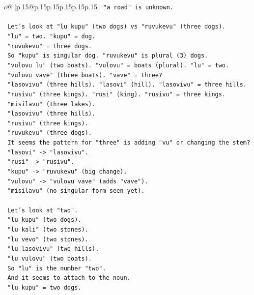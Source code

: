 \documentclass{article}
\begin{document}
{\begin{supertabular}{c@{$\;$}|p{.15\linewidth}@{}p{.15\linewidth}p{.15\linewidth}p{.15\linewidth}p{.15\linewidth}p{.15\linewidth}}
{{{\texttt{   "a road" is unknown.} \\
\\ 
\texttt{   Let's look at "lu kupu" (two dogs) vs "ruvukevu" (three dogs).} \\
\texttt{   "lu" = two. "kupu" = dog.} \\
\texttt{   "ruvukevu" = three dogs.} \\
\texttt{   So "kupu" is singular dog. "ruvukevu" is plural (3) dogs.} \\
\texttt{   "vulovu lu" (two boats). "vulovu" = boats (plural). "lu" = two.} \\
\texttt{   "vulovu vave" (three boats). "vave" = three?} \\
\texttt{   "lasovivu" (three hills). "lasovi" (hill). "lasovivu" = three hills.} \\
\texttt{   "rusivu" (three kings). "rusi" (king). "rusivu" = three kings.} \\
\texttt{   "misilavu" (three lakes).} \\
\texttt{   "lasovivu" (three hills).} \\
\texttt{   "rusivu" (three kings).} \\
\texttt{   "ruvukevu" (three dogs).} \\
\texttt{   It seems the pattern for "three" is adding "vu" or changing the stem?} \\
\texttt{   "lasovi" {-}> "lasovivu".} \\
\texttt{   "rusi" {-}> "rusivu".} \\
\texttt{   "kupu" {-}> "ruvukevu" (big change).} \\
\texttt{   "vulovu" {-}> "vulovu vave" (adds "vave").} \\
\texttt{   "misilavu" (no singular form seen yet).} \\
\\ 
\texttt{   Let's look at "two".} \\
\texttt{   "lu kupu" (two dogs).} \\
\texttt{   "lu kali" (two stones).} \\
\texttt{   "lu vevo" (two stones).} \\
\texttt{   "lu lasovivu" (two hills).} \\
\texttt{   "lu vulovu" (two boats).} \\
\texttt{   So "lu" is the number "two".} \\
\texttt{   And it seems to attach to the noun.} \\
\texttt{   "lu kupu" = two dogs.} \\
}}}
\end{supertabular}}
\end{document}
